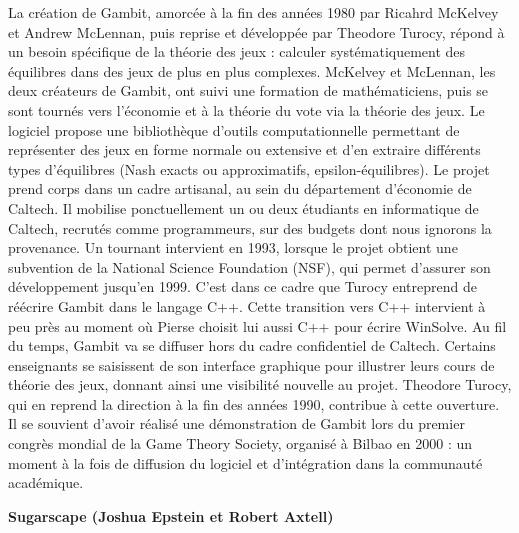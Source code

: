 La création de Gambit, amorcée à la fin des années 1980 par Ricahrd McKelvey et Andrew McLennan, puis reprise et développée par Theodore Turocy, répond à un besoin spécifique de la théorie des jeux : calculer systématiquement des équilibres dans des jeux de plus en plus complexes. McKelvey et McLennan, les deux créateurs de Gambit, ont suivi une formation de mathématiciens, puis se sont tournés vers l'économie et à la théorie du vote via la théorie des jeux. Le logiciel propose une bibliothèque d'outils computationnelle permettant de représenter des jeux en forme normale ou extensive et d’en extraire différents types d’équilibres (Nash exacts ou approximatifs, epsilon-équilibres). Le projet prend corps dans un cadre artisanal, au sein du département d’économie de Caltech. Il mobilise ponctuellement un ou deux étudiants en informatique de Caltech, recrutés comme programmeurs, sur des budgets dont nous ignorons la provenance. Un tournant intervient en 1993, lorsque le projet obtient une subvention de la National Science Foundation (NSF), qui permet d’assurer son développement jusqu’en 1999. C’est dans ce cadre que Turocy entreprend de réécrire Gambit dans le langage C++. Cette transition vers C++ intervient à peu près au moment où Pierse choisit lui aussi C++ pour écrire WinSolve.
Au fil du temps, Gambit va se diffuser hors du cadre confidentiel de Caltech. Certains enseignants se saisissent de son interface graphique pour illustrer leurs cours de théorie des jeux, donnant ainsi une visibilité nouvelle au projet. Theodore Turocy, qui en reprend la direction à la fin des années 1990, contribue à cette ouverture. Il se souvient d’avoir réalisé une démonstration de Gambit lors du premier congrès mondial de la Game Theory Society, organisé à Bilbao en 2000 : un moment à la fois de diffusion du logiciel et d’intégration dans la communauté académique.



\textbf{Sugarscape (Joshua Epstein et Robert Axtell)}

